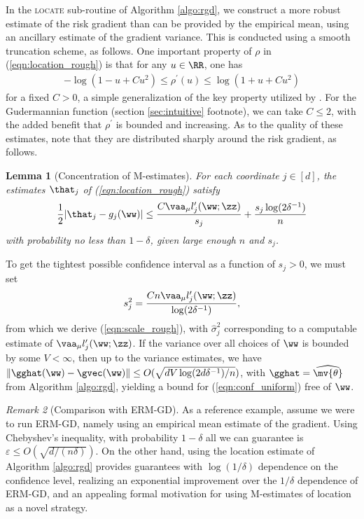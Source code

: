\documentclass[11pt,oneside]{article}
\theoremstyle{definition} \newtheorem{defn}{Definition}       %
\theoremstyle{plain} \newtheorem{prop}[defn]{Proposition}           %
\theoremstyle{plain} \newtheorem{thm}[defn]{Theorem}                %
\theoremstyle{plain} \newtheorem{lem}[defn]{Lemma}                  %
\theoremstyle{plain} \newtheorem{cor}[defn]{Corollary}              %
\theoremstyle{remark} \newtheorem{rmk}[defn]{Remark}                %
\theoremstyle{remark} \newtheorem{ex}[defn]{Example}                %
\begin{document}
In the \textsc{locate} sub-routine of Algorithm \ref{algo:rgd}, we construct a more robust estimate of the risk gradient than can be provided by the empirical mean, using an ancillary estimate of the gradient variance. This is conducted using a smooth truncation scheme, as follows. One important property of $\rho$ in (\ref{eqn:location_rough}) is that for any $u \in \RR$, one has
%
\begin{align}\label{eqn:rho_Catoni_condition}
-\log(1-u+Cu^{2}) \leq \rho^{\prime}(u) \leq \log(1+u+Cu^{2})
\end{align}
%
for a fixed $C>0$, a simple generalization of the key property utilized by \citet{catoni2012a}. For the Gudermannian function (section \ref{sec:intuitive} footnote), we can take $C \leq 2$, with the added benefit that $\rho^{\prime}$ is bounded and increasing. As to the quality of these estimates, note that they are distributed sharply around the risk gradient, as follows.
%
\begin{lem}[Concentration of M-estimates]\label{lem:sharp_Mest}
For each coordinate $j \in [d]$, the estimates $\that_{j}$ of (\ref{eqn:location_rough}) satisfy
%
\begin{align}\label{eqn:sharp_Mest}
\frac{1}{2}|\that_{j}-g_{j}(\ww)| \leq\frac{C\vaa_{\mu}l_{j}^{\prime}(\ww;\zz)}{s_{j}} + \frac{s_{j}\log(2\delta^{-1})}{n}
\end{align}
%
with probability no less than $1-\delta$, given large enough $n$ and $s_{j}$.
\end{lem}
%
\noindent To get the tightest possible confidence interval as a function of $s_{j} > 0$, we must set
%
\begin{align*}
s_{j}^{2} = \frac{Cn\vaa_{\mu}l_{j}^{\prime}(\ww;\zz)}{\log(2\delta^{-1})},
\end{align*}
%
from which we derive (\ref{eqn:scale_rough}), with $\widehat{\sigma}_{j}^{2}$ corresponding to a computable estimate of $\vaa_{\mu}l_{j}^{\prime}(\ww;\zz)$. If the variance over all choices of $\ww$ is bounded by some $V < \infty$, then up to the variance estimates, we have $\|\gghat(\ww)-\gvec(\ww)\| \leq O(\sqrt{dV\log(2d\delta^{-1})/n})$, with $\gghat = \widehat{\mv{\theta}}$ from Algorithm \ref{algo:rgd}, yielding a bound for (\ref{eqn:conf_uniform}) free of $\ww$.

\begin{rmk}[Comparison with ERM-GD]
As a reference example, assume we were to run ERM-GD, namely using an empirical mean estimate of the gradient. Using Chebyshev's inequality, with probability $1-\delta$ all we can guarantee is $\varepsilon \leq O(\sqrt{d/(n\delta)})$. On the other hand, using the location estimate of Algorithm \ref{algo:rgd} provides guarantees with $\log(1/\delta)$ dependence on the confidence level, realizing an exponential improvement over the $1/\delta$ dependence of ERM-GD, and an appealing formal motivation for using M-estimates of location as a novel strategy.
\end{rmk}
\end{document}
